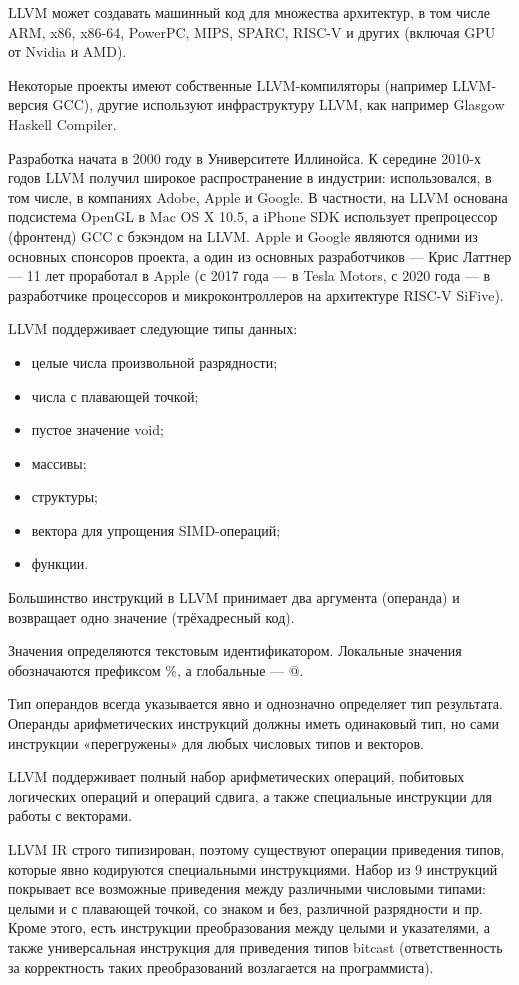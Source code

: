 LLVM может создавать машинный код для множества архитектур, в том числе ARM, x86, x86-64, PowerPC, MIPS, SPARC, RISC-V и других (включая GPU от Nvidia и AMD).

Некоторые проекты имеют собственные LLVM-компиляторы (например LLVM-версия GCC), другие используют инфраструктуру LLVM, как например Glasgow Haskell Compiler.

Разработка начата в 2000 году в Университете Иллинойса. К середине 2010-х годов LLVM получил широкое распространение в индустрии: использовался, в том числе, в компаниях Adobe, Apple и Google. В частности, на LLVM основана подсистема OpenGL в Mac OS X 10.5, а iPhone SDK использует препроцессор (фронтенд) GCC с бэкэндом на LLVM. Apple и Google являются одними из основных спонсоров проекта, а один из основных разработчиков — Крис Латтнер — 11 лет проработал в Apple (с 2017 года — в Tesla Motors, с 2020 года — в разработчике процессоров и микроконтроллеров на архитектуре RISC-V SiFive).

LLVM поддерживает следующие типы данных:
\begin{itemize}
	\item целые числа произвольной разрядности;
	\item числа с плавающей точкой;
	\item пустое значение void;
	\item массивы;
	\item структуры;
	\item вектора для упрощения SIMD-операций;
	\item функции.
\end{itemize}

Большинство инструкций в LLVM принимает два аргумента (операнда) и возвращает одно значение (трёхадресный код).

Значения определяются текстовым идентификатором.
Локальные значения обозначаются префиксом \%, а глобальные — @.

Тип операндов всегда указывается явно и однозначно определяет тип результата.
Операнды арифметических инструкций должны иметь одинаковый тип, но сами инструкции «перегружены» для любых числовых типов и векторов.

LLVM поддерживает полный набор арифметических операций, побитовых логических операций и операций сдвига, а также специальные инструкции для работы с векторами.

LLVM IR строго типизирован, поэтому существуют операции приведения типов, которые явно кодируются специальными инструкциями.
Набор из 9 инструкций покрывает все возможные приведения между различными числовыми типами: целыми и с плавающей точкой, со знаком и без, различной разрядности и пр.
Кроме этого, есть инструкции преобразования между целыми и указателями, а также универсальная инструкция для приведения типов bitcast (ответственность за корректность таких преобразований возлагается на программиста).

